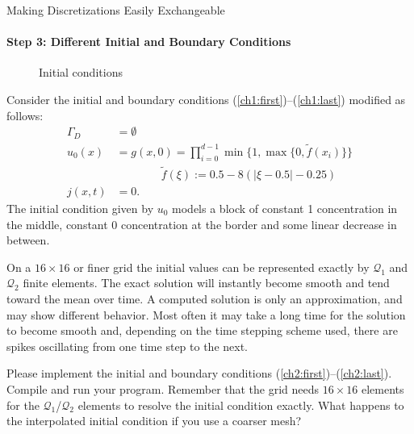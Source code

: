 \documentclass[12pt,a4paper]{article}
\begin{document}
\begin{Exercise}{Making Discretizations Easily Exchangeable}
  \paragraph{Step 3: Different Initial and Boundary Conditions}
  \quad \newline
  \begin{figure}
    \centering
    \caption{Initial conditions}
  \end{figure}
  Consider the initial and boundary conditions
  (\ref{ch1:first})--(\ref{ch1:last}) modified as follows:
  \begin{align}
    \label{ch2:first}
    \Gamma_D&=\emptyset \\
    u_0(x) &= g(x, 0) = \prod_{i=0}^{d-1}\min\{1,\max\{0,\tilde{f}(x_i)\}\} \\
        & \qquad\qquad \tilde{f}(\xi):=0.5-8(|\xi-0.5|-0.25) \nonumber \\
    \label{ch2:last}
    j(x,t)&=0 .
  \end{align}
  The initial condition given by $u_0$ models a block of constant 1
  concentration in the middle, constant 0 concentration at the border
  and some linear decrease in between.

  On a $16\times16$ or finer grid the initial values can be represented
  exactly by $\mathcal{Q}_1$ and $\mathcal{Q}_2$ finite elements.
  The exact solution will instantly
  become smooth and tend toward the mean over time.  A computed solution is
  only an approximation, and may show different behavior.  Most often it may
  take a long time for the solution to become smooth and, depending on
  the time stepping scheme used, there are spikes oscillating from one
  time step to the next.

  Please implement the initial and boundary conditions
  (\ref{ch2:first})--(\ref{ch2:last}). Compile and run your program.
  Remember that the grid needs $16\times16$ elements for the
  $\mathcal{Q}_1$/$\mathcal{Q}_2$ elements to resolve the initial
  condition exactly.  What happens to the interpolated initial condition
  if you use a coarser mesh?


\end{Exercise}
\end{document}
